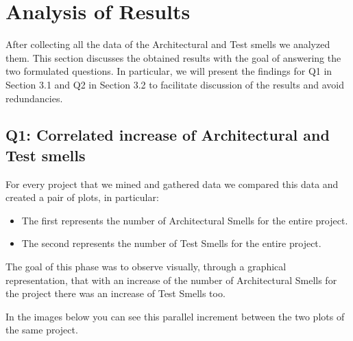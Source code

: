 \section{Analysis of Results}\label{sec:results}

After collecting all the data of the Architectural and Test smells we analyzed them. This section discusses the obtained results with the goal of answering the two formulated questions. In particular, we will present the findings for Q1 in Section 3.1 and Q2 in Section 3.2 to facilitate discussion of the results and avoid redundancies.

\subsection{Q1: Correlated increase of Architectural and Test smells}
For every project that we mined and gathered data we compared this data and created a pair of plots, in particular:
\begin{itemize}
  \item The first represents the number of Architectural Smells for the entire project.
  \item The second represents the number of Test Smells for the entire project.
\end{itemize}
The goal of this phase was to observe visually, through a graphical representation, that with an increase of the number of Architectural Smells for the project there was an increase of Test Smells too.

In the images below you can see this parallel increment between the two plots of the same project.

